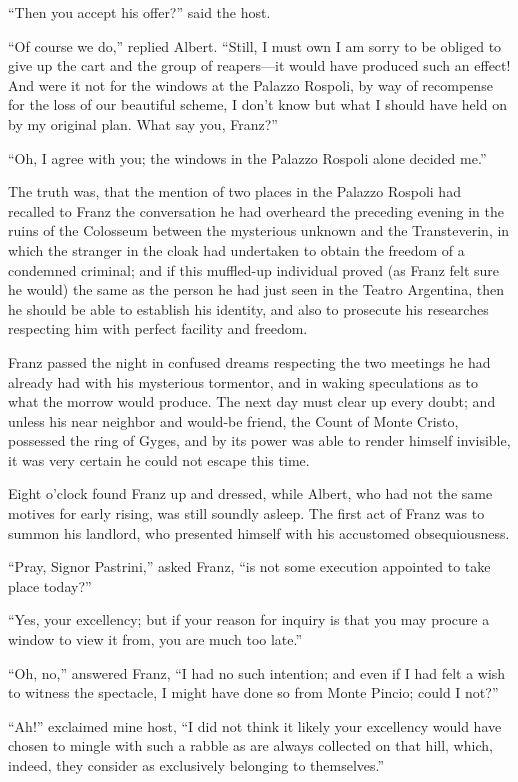 “Then you accept his offer?” said the host.

“Of course we do,” replied Albert. “Still, I must own I am sorry to be
obliged to give up the cart and the group of reapers—it would have
produced such an effect! And were it not for the windows at the Palazzo
Rospoli, by way of recompense for the loss of our beautiful scheme, I
don’t know but what I should have held on by my original plan. What say
you, Franz?”

“Oh, I agree with you; the windows in the Palazzo Rospoli alone decided
me.”

The truth was, that the mention of two places in the Palazzo Rospoli
had recalled to Franz the conversation he had overheard the preceding
evening in the ruins of the Colosseum between the mysterious unknown
and the Transteverin, in which the stranger in the cloak had undertaken
to obtain the freedom of a condemned criminal; and if this muffled-up
individual proved (as Franz felt sure he would) the same as the person
he had just seen in the Teatro Argentina, then he should be able to
establish his identity, and also to prosecute his researches respecting
him with perfect facility and freedom.

Franz passed the night in confused dreams respecting the two meetings
he had already had with his mysterious tormentor, and in waking
speculations as to what the morrow would produce. The next day must
clear up every doubt; and unless his near neighbor and would-be friend,
the Count of Monte Cristo, possessed the ring of Gyges, and by its
power was able to render himself invisible, it was very certain he
could not escape this time.

Eight o’clock found Franz up and dressed, while Albert, who had not the
same motives for early rising, was still soundly asleep. The first act
of Franz was to summon his landlord, who presented himself with his
accustomed obsequiousness.

“Pray, Signor Pastrini,” asked Franz, “is not some execution appointed
to take place today?”

“Yes, your excellency; but if your reason for inquiry is that you may
procure a window to view it from, you are much too late.”

“Oh, no,” answered Franz, “I had no such intention; and even if I had
felt a wish to witness the spectacle, I might have done so from Monte
Pincio; could I not?”

“Ah!” exclaimed mine host, “I did not think it likely your excellency
would have chosen to mingle with such a rabble as are always collected
on that hill, which, indeed, they consider as exclusively belonging to
themselves.”

